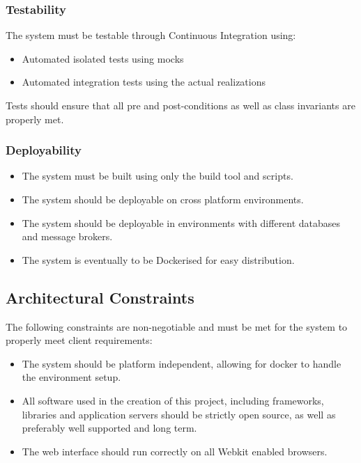 \documentclass[11pt,a4paper]{article}
\begin{document}
\subsubsection{Testability}
The system must be testable through Continuous Integration using:  
\begin{itemize}
	\item Automated isolated tests using mocks
	\item Automated integration tests using the actual realizations 
\end{itemize}
Tests should ensure that all pre and post-conditions as well as class invariants are properly met.

\subsubsection{Deployability}
\begin{itemize}
	\item The system must be built using only the build tool and scripts.
	\item The system should be deployable on cross platform environments.
	\item The system should be deployable in environments with different databases and message brokers.
	\item The system is eventually to be Dockerised for easy distribution. 
\end{itemize}

\subsection{Architectural Constraints}
The following constraints are non-negotiable and must be met for the system to properly meet client requirements:
\begin{itemize}
	\item The system should be platform independent, allowing for docker to handle the environment setup.
	\item All software used in the creation of this project, including frameworks, libraries and application servers should be strictly open source, as well as preferably well supported and long term.
	\item The web interface should run correctly on all Webkit enabled browsers.
\end{itemize}
\end{document}
